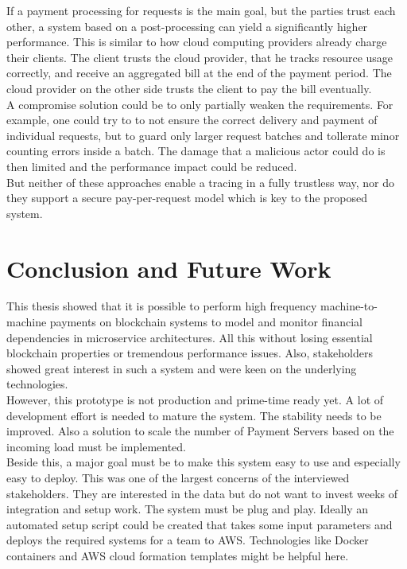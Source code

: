 \documentclass[a4paper,12pt]{scrartcl}
\begin{document}
If a payment processing for requests is the main goal, but the parties trust each other, a system based on a post-processing can yield a significantly higher performance.  This is similar to how cloud computing providers already charge their clients. The client trusts the cloud provider, that he tracks resource usage correctly, and receive an aggregated bill at the end of the payment period. The cloud provider on the other side trusts the client to pay the bill eventually.\\

A compromise solution could be to only partially weaken the requirements. For example, one could try to to not ensure the correct delivery and payment of individual requests, but to guard only larger request batches and tollerate minor counting errors inside a batch. The damage that a malicious actor could do is then limited and the performance impact could be reduced.\\

But neither of these approaches enable a tracing in a fully trustless way, nor do they support a secure pay-per-request model which is key to the proposed system.\\

\newpage
\section{Conclusion and Future Work}

This thesis showed that it is possible to perform high frequency machine-to-machine payments on blockchain systems to model and monitor financial dependencies in microservice architectures. All this without losing essential blockchain properties or tremendous performance issues. Also, stakeholders showed great interest in such a system and were keen on the underlying technologies.\\

However, this prototype is not production and prime-time ready yet. A lot of development effort is needed to mature the system. The stability needs to be improved. Also a solution to scale the number of Payment Servers based on the incoming load must be implemented.\\
Beside this, a major goal must be to make this system easy to use and especially easy to deploy. This was one of the largest concerns of the interviewed stakeholders. They are interested in the data but do not want to invest weeks of integration and setup work. The system must be plug and play. Ideally an automated setup script could be created that takes some input parameters and deploys the required systems for a team to AWS. Technologies like Docker containers and AWS cloud formation templates might be helpful here.\\
\end{document}
